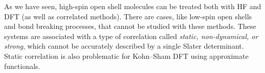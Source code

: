 \documentclass[../Main/chem371-notes.tex]{subfiles}
\begin{document}

As we have seen, high-spin open shell molecules can be treated both with HF and DFT (as well as correlated methods).
There are cases, like low-spin open shells and bond breaking processes, that cannot be studied with these methods.
These systems are associated with a type of correlation called \emph{static, non-dynamical, or strong}, which cannot be accurately described by a single Slater determinant.
Static correlation is also problematic for Kohn--Sham DFT using approximate functionals.
\end{document}
